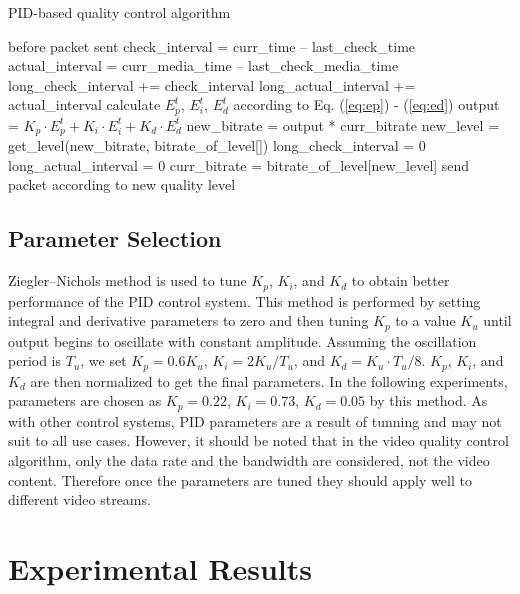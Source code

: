 \documentclass[journal]{IEEEtran}
\begin{document}
\begin{algorithm}
\caption{PID-based quality control algorithm}
\label{algo:control}
\begin{algorithmic}
    \STATE before packet sent
    \STATE check\_interval = curr\_time -- last\_check\_time
    \STATE actual\_interval = curr\_media\_time -- last\_check\_media\_time
    \STATE long\_check\_interval += check\_interval
    \STATE long\_actual\_interval += actual\_interval
    \STATE calculate $E_p^t$, $E_i^t$, $E_d^t$ according to Eq. (\ref{eq:ep}) - (\ref{eq:ed})
    \STATE output = ${K_p} \cdot E_p^t + {K_i} \cdot E_i^t + {K_d} \cdot E_d^t$
    \STATE new\_bitrate = output * curr\_bitrate
    \STATE new\_level = get\_level(new\_bitrate, bitrate\_of\_level[])
    	\STATE long\_check\_interval = 0
    	\STATE long\_actual\_interval = 0
    	\STATE curr\_bitrate = bitrate\_of\_level[new\_level]
    \ENDIF
    \STATE send packet according to new quality level
\end{algorithmic}
\end{algorithm}


\subsection{Parameter Selection}
\label{subsec:parameter}

Ziegler--Nichols method \cite{Ziegler42} is used to tune $K_p$, $K_i$, and $K_d$ to obtain better performance of the PID control system. This method is performed by setting integral and derivative parameters to zero and then tuning $K_p$ to a value $K_u$ until output begins to oscillate with constant amplitude. Assuming the oscillation period is $T_u$, we set $K_p = 0.6K_u$, $K_i = 2K_u/T_u$, and $K_d = K_u \cdot T_u/8$. $K_p$, $K_i$, and $K_d$ are then normalized to get the final parameters. In the following experiments, parameters are chosen as $K_p = 0.22$, $K_i = 0.73$, $K_d = 0.05$ by this method. As with other control systems, PID parameters are a result of tunning and may not suit to all use cases. However, it should be noted that in the video quality control algorithm, only the data rate and the bandwidth are considered, not the video content. Therefore once the parameters are tuned they should apply well to different video streams.


\section{Experimental Results}
\label{sec:experiment}
\end{document}
